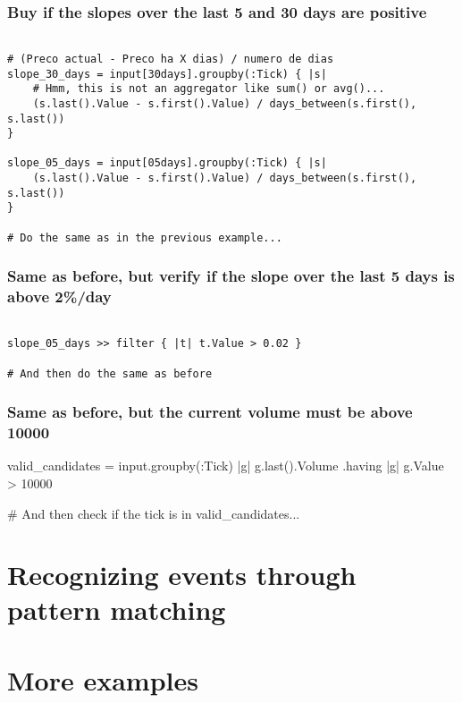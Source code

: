 \documentclass[twoside]{report}
\begin{document}
\subsection{Buy if the slopes over the last 5 and 30 days are positive}

\begin{verbatim}

# (Preco actual - Preco ha X dias) / numero de dias
slope_30_days = input[30days].groupby(:Tick) { |s|
    # Hmm, this is not an aggregator like sum() or avg()...
    (s.last().Value - s.first().Value) / days_between(s.first(), s.last())
}

slope_05_days = input[05days].groupby(:Tick) { |s|
    (s.last().Value - s.first().Value) / days_between(s.first(), s.last())
}

# Do the same as in the previous example...

\end{verbatim}

\subsection{Same as before, but verify if the slope over the last 5 days is above 2\%/day}

\begin{verbatim}

slope_05_days >> filter { |t| t.Value > 0.02 }

# And then do the same as before

\end{verbatim}

\subsection{Same as before, but the current volume must be above 10000}

valid_candidates = input.groupby(:Tick) { |g| g.last().Volume }.having { |g| g.Value > 10000 }

# And then check if the tick is in valid_candidates...

\chapter{Recognizing events through pattern matching}
\chapter{More examples}
\end{document}
